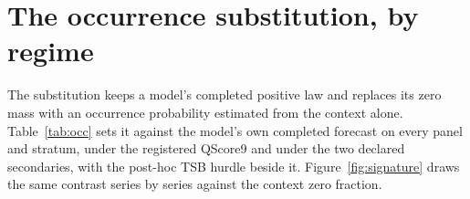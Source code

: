 \providecommand{\lm}{\texttt{local\_mean\_28}}
\providecommand{\qs}{QScore9}
\providecommand{\hc}{\texttt{hurdle\_count\_28}}

\section{The occurrence substitution, by regime}
\label{sec:occurrence}

The substitution keeps a model's completed positive law and replaces its zero mass with an occurrence
probability estimated from the context alone. Table~\ref{tab:occ} sets it against the model's own completed
forecast on every panel and stratum, under the registered \qs{} and under the two declared secondaries, with
the post-hoc TSB hurdle beside it. Figure~\ref{fig:signature} draws the same contrast series by series against
the context zero fraction.


